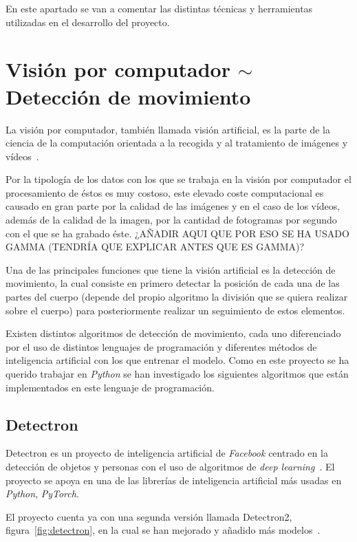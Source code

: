 
En este apartado se van a comentar las distintas técnicas y herramientas utilizadas en el desarrollo del proyecto.

\section{Visión por computador $\sim$ Detección de movimiento}
La visión por computador, también llamada visión artificial, es la parte de la ciencia de la computación orientada a la recogida y al tratamiento de imágenes y vídeos~\cite{wiki:visionartificial}.

Por la tipología de los datos con los que se trabaja en la visión por computador el procesamiento de éstos es muy costoso, este elevado coste computacional es causado en gran parte por la calidad de las imágenes y en el caso de los vídeos, además de la calidad de la imagen, por la cantidad de fotogramas por segundo con el que se ha grabado éste. ¿AÑADIR AQUI QUE POR ESO SE HA USADO GAMMA (TENDRÍA QUE EXPLICAR ANTES QUE ES GAMMA)?

Una de las principales funciones que tiene la visión artificial es la detección de movimiento, la cual consiste en primero detectar la posición de cada una de las partes del cuerpo (depende del propio algoritmo la división que se quiera realizar sobre el cuerpo) para posteriormente realizar un seguimiento de estos elementos.

Existen distintos algoritmos de detección de movimiento, cada uno diferenciado por el uso de distintos lenguajes de programación y diferentes métodos de inteligencia artificial con los que entrenar el modelo. Como en este proyecto se ha querido trabajar en \textit{Python} se han investigado los siguientes algoritmos que están implementados en este lenguaje de programación. 

\subsection{Detectron}
Detectron es un proyecto de inteligencia artificial de \textit{Facebook} centrado en la detección de objetos y personas con el uso de algoritmos de \textit{deep learning}~\cite{Detectron2018}. El proyecto se apoya en una de las librerías de inteligencia artificial más usadas en \textit{Python}, \textit{PyTorch}.

El proyecto cuenta ya con una segunda versión llamada Detectron2, figura~\ref{fig:detectron}, en la cual se han mejorado y añadido más modelos~\cite{wu2019detectron2}.

